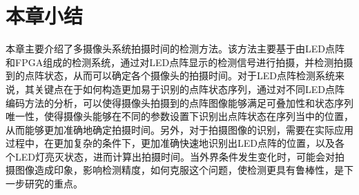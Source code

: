 \section{本章小结}
本章主要介绍了多摄像头系统拍摄时间的检测方法。该方法主要基于由LED点阵和FPGA组成的检测系统，通过对LED点阵显示的检测信号进行拍摄，并检测拍摄到的点阵状态，从而可以确定各个摄像头的拍摄时间。对于LED点阵检测系统来说，其关键点在于如何构造更加易于识别的点阵状态序列，通过对不同LED点阵编码方法的分析，可以使得摄像头拍摄到的点阵图像能够满足可叠加性和状态序列唯一性，使得摄像头能够在不同的参数设置下识别出点阵状态在序列当中的位置，从而能够更加准确地确定拍摄时间。另外，对于拍摄图像的识别，需要在实际应用过程中，在更加复杂的条件下，更加准确快速地识别出LED点阵的位置，以及各个LED灯亮灭状态，进而计算出拍摄时间。当外界条件发生变化时，可能会对拍摄图像造成印象，影响检测精度，如何克服这个问题，使检测更具有鲁棒性，是下一步研究的重点。




















































